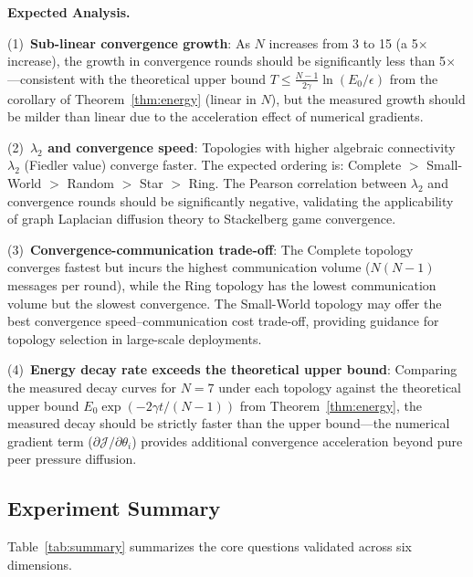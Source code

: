 \documentclass[12pt,a4paper]{article}
\begin{document}
\textbf{Expected Analysis.}

(1)~\textbf{Sub-linear convergence growth}: As $N$ increases from 3 to 15 (a 5$\times$ increase), the growth in convergence rounds should be significantly less than 5$\times$---consistent with the theoretical upper bound $T \leq \frac{N-1}{2\gamma} \ln(E_0/\epsilon)$ from the corollary of Theorem~\ref{thm:energy} (linear in $N$), but the measured growth should be milder than linear due to the acceleration effect of numerical gradients.

(2)~\textbf{$\lambda_2$ and convergence speed}: Topologies with higher algebraic connectivity $\lambda_2$ (Fiedler value) converge faster. The expected ordering is: Complete $>$ Small-World $>$ Random $>$ Star $>$ Ring. The Pearson correlation between $\lambda_2$ and convergence rounds should be significantly negative, validating the applicability of graph Laplacian diffusion theory to Stackelberg game convergence.

(3)~\textbf{Convergence-communication trade-off}: The Complete topology converges fastest but incurs the highest communication volume ($N(N-1)$ messages per round), while the Ring topology has the lowest communication volume but the slowest convergence. The Small-World topology may offer the best convergence speed--communication cost trade-off, providing guidance for topology selection in large-scale deployments.

(4)~\textbf{Energy decay rate exceeds the theoretical upper bound}: Comparing the measured decay curves for $N=7$ under each topology against the theoretical upper bound $E_0 \exp(-2\gamma t/(N-1))$ from Theorem~\ref{thm:energy}, the measured decay should be strictly faster than the upper bound---the numerical gradient term ($\partial \mathcal{J}/\partial \theta_i$) provides additional convergence acceleration beyond pure peer pressure diffusion.

\subsection{Experiment Summary}

Table~\ref{tab:summary} summarizes the core questions validated across six dimensions.
\end{document}
